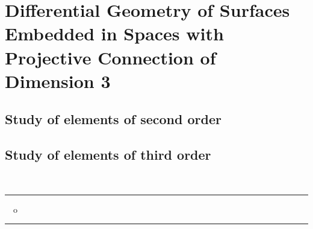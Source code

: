 
\chapter{Differential Geometry of Surfaces Embedded in Spaces with Projective Connection of Dimension 3}


\section{Study of elements of second order}
             
%
%
%
%
%


\section{Study of elements of third order}

%
%
%
%




\ \\[.5cm]
\begin{center}
\rule{2cm}{.03cm} \ \ o \ \ \rule{2cm}{.03cm} 
\end{center} 


%





























